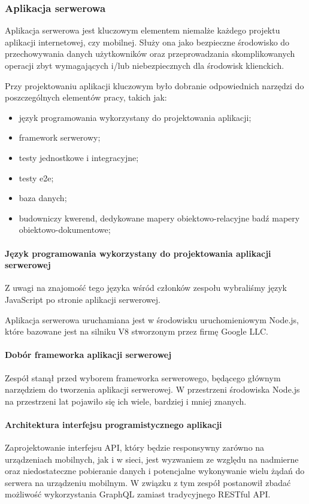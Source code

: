 \documentclass[12pt, a4paper, twoside, openany]{book}
\newcommand{\forceindent}{\leavevmode{\parindent=1.3em\indent}}
\begin{document}
\subsubsection{Aplikacja serwerowa}

\forceindent Aplikacja serwerowa jest kluczowym elementem niemalże każdego projektu aplikacji
internetowej, czy mobilnej. Służy ona jako bezpieczne środowisko do przechowywania danych
użytkowników oraz przeprowadzania skomplikowanych operacji zbyt wymagających i/lub
niebezpiecznych dla środowisk klienckich.

Przy projektowaniu aplikacji kluczowym było dobranie odpowiednich narzędzi do
poszczególnych elementów pracy, takich jak:
\begin{itemize}
    \item język programowania wykorzystany do projektowania aplikacji;
    \item framework serwerowy;
    \item testy jednostkowe i integracyjne;
    \item testy e2e;
    \item baza danych;
    \item budowniczy kwerend, dedykowane mapery obiektowo-relacyjne badź mapery obiektowo-dokumentowe;
\end{itemize}

\paragraph{Język programowania wykorzystany do projektowania aplikacji serwerowej\\}

\forceindent Z uwagi na znajomość tego języka wśród członków zespołu wybraliśmy język JavaScript
po stronie aplikacji serwerowej.

Aplikacja serwerowa uruchamiana jest w środowisku uruchomieniowym Node.js, które bazowane jest na
silniku V8 stworzonym przez firmę Google LLC.

\paragraph{Dobór frameworka aplikacji serwerowej\\}
\forceindent Zespół stanął przed wyborem frameworka serwerowego, będącego głównym narzędziem do tworzenia aplikacji serwerowej.
W przestrzeni środowiska Node.js na przestrzeni lat pojawiło się ich wiele, bardziej i
mniej znanych.

\paragraph{Architektura interfejsu programistycznego aplikacji\\}
\forceindent Zaprojektowanie interfejsu API, który będzie responsywny zarówno na urządzeniach mobilnych, jak i w sieci, jest wyzwaniem ze względu na nadmierne oraz niedostateczne pobieranie danych i potencjalne wykonywanie wielu żądań do serwera na urządzeniu mobilnym.
W związku z tym zespół postanowił zbadać możliwość wykorzystania GraphQL zamiast tradycyjnego RESTful API.
\end{document}
